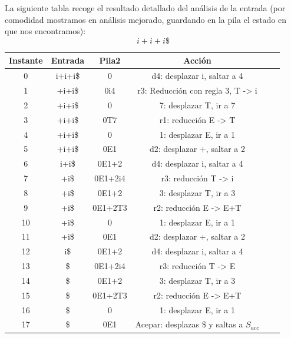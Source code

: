 \documentclass{apuntes}
\begin{document}
\begin{example}
La siguiente tabla recoge el resultado detallado del análisis de la entrada (por comodidad mostramos en análisis mejorado, guardando en la pila el estado en que nos encontramos):
\[i+i+i\$\]
\begin{tabular}{| c | c | c | c | c | c |}
\hline
Instante & Entrada &  Pila2 & Acción \\
\hline
0 & i+i+i\$ & 0 & d4: desplazar i, saltar a 4\\
\hline
1 & +i+i\$ & 0i4 & r3: Reducción con regla 3, T -> i \\
\hline
2 & +i+i\$ & 0& 7: desplazar T, ir a 7 \\
\hline
3 & +i+i\$ & 0T7 & r1: reducción E -> T\\
\hline
4  & +i+i\$ & 0 & 1: desplazar E, ir a 1 \\
\hline
5 & +i+i\$  & 0E1 & d2: desplazar +, saltar a 2\\
\hline
6 & i+i\$  & 0E1+2 & d4: desplazar i, saltar a 4\\
\hline
7 & +i\$ & 0E1+2i4 & r3: reducción T -> i \\
\hline
8 & +i\$ & 0E1+2 & 3: desplazar T, ir a 3 \\
\hline
9 & +i\$ & 0E1+2T3 & r2: reducción E -> E+T \\
\hline
10 & +i\$ & 0 & 1: desplazar E, ir a 1 \\
\hline
11 & +i\$ & 0E1 & d2: desplazar +, saltar a 2 \\
\hline
12 & i\$ & 0E1+2 & d4: desplazar i, saltar a 4 \\
\hline
13 & \$ & 0E1+2i4 & r3: reducción T -> E\\
\hline
14 & \$ & 0E1+2 & 3: desplazar T, ir a 3 \\
\hline
15 & \$ & 0E1+2T3 & r2: reducción E -> E+T \\
\hline
16 & \$ & 0 & 1: desplazar E, ir a 1 \\
\hline
17 & \$ & 0E1 & Acepar: desplazas \$ y saltas a $S_{acc}$ \\
\hline
\end{tabular}
\end{example}
\end{document}
